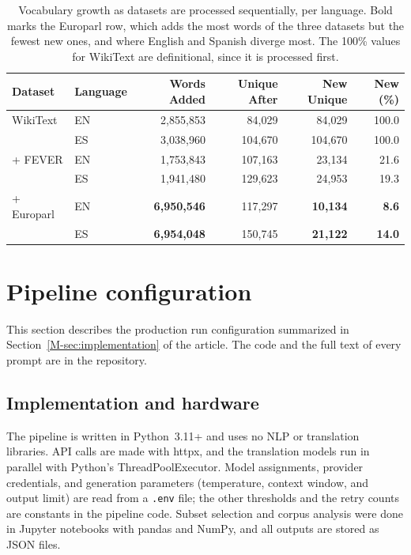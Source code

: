 \documentclass[11pt]{article}
\DeclareRobustCommand{\mainref}[1]{\ref*{M-#1}}
\begin{document}
\begin{table}[h!]
\centering
\caption{Vocabulary growth as datasets are processed sequentially, per language. Bold marks the Europarl row, which adds the most words of the three datasets but the fewest new ones, and where English and Spanish diverge most. The 100\% values for WikiText are definitional, since it is processed first.}
\label{tabS:growth-curve}
\scriptsize
\begin{tabular*}{\textwidth}{@{\extracolsep{\fill}}llrrrr}
\toprule
\textbf{Dataset} & \textbf{Language} & \textbf{Words Added} & \textbf{Unique After} & \textbf{New Unique} & \textbf{New (\%)} \\
\midrule
WikiText   & EN & 2,855,853 & 84,029  & 84,029 & 100.0 \\
           & ES & 3,038,960 & 104,670 & 104,670 & 100.0 \\
\midrule
+ FEVER    & EN & 1,753,843 & 107,163 & 23,134 & 21.6 \\
           & ES & 1,941,480 & 129,623 & 24,953 & 19.3 \\
\midrule
+ Europarl & EN & \textbf{6,950,546} & 117,297 & \textbf{10,134} & \textbf{8.6} \\
           & ES & \textbf{6,954,048} & 150,745 & \textbf{21,122} & \textbf{14.0} \\
\bottomrule
\end{tabular*}
\end{table}

\clearpage
\section{Pipeline configuration}
\label{secS:config}

This section describes the production run configuration summarized in Section~\mainref{sec:implementation} of the article. The code and the full text of every prompt are in the repository.

\subsection{Implementation and hardware}
\label{secS:hardware}

The pipeline is written in Python~3.11+ and uses no NLP or translation libraries. API calls are made with httpx, and the translation models run in parallel with Python's ThreadPoolExecutor. Model assignments, provider credentials, and generation parameters (temperature, context window, and output limit) are read from a \texttt{.env} file; the other thresholds and the retry counts are constants in the pipeline code. Subset selection and corpus analysis were done in Jupyter notebooks with pandas and NumPy, and all outputs are stored as JSON files.
\end{document}
